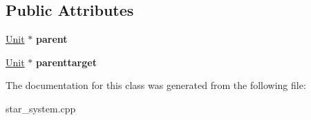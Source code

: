 \subsection*{Public Attributes}
\begin{DoxyCompactItemize}
\item 
\hyperlink{classUnit}{Unit} $\ast$ {\bfseries parent}\hypertarget{classUnitDrawer_a9d0b1d705c9f0ec74dea8d51c76ba8b7}{}\label{classUnitDrawer_a9d0b1d705c9f0ec74dea8d51c76ba8b7}

\item 
\hyperlink{classUnit}{Unit} $\ast$ {\bfseries parenttarget}\hypertarget{classUnitDrawer_ac97283bce29293f5843caebfe783ecdd}{}\label{classUnitDrawer_ac97283bce29293f5843caebfe783ecdd}

\end{DoxyCompactItemize}


The documentation for this class was generated from the following file\+:\begin{DoxyCompactItemize}
\item 
star\+\_\+system.\+cpp\end{DoxyCompactItemize}
